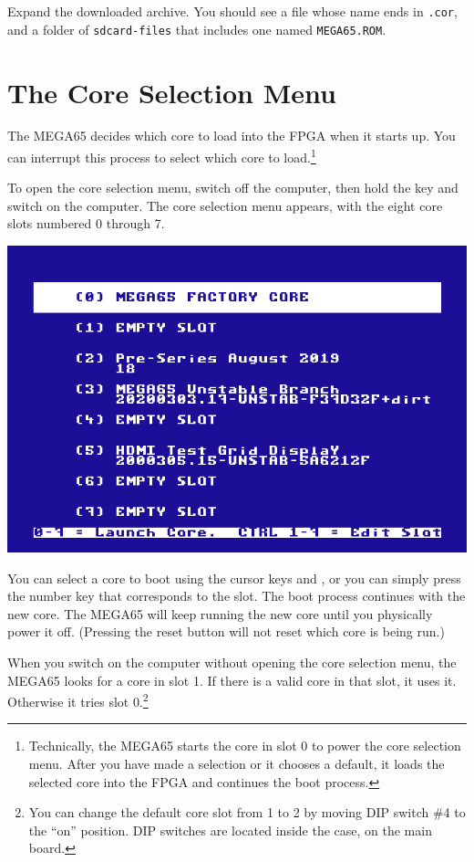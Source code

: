 Expand the downloaded archive. You should see a file whose name ends in {\tt .cor}, and a folder of {\tt sdcard-files} that includes one named {\tt MEGA65.ROM}.

\section{The Core Selection Menu}

The MEGA65 decides which core to load into the FPGA when it starts up. You can interrupt this process to select which core to load.\footnote{Technically, the MEGA65 starts the core in slot 0 to power the core selection menu. After you have made a selection or it chooses a default, it loads the selected core into the FPGA and continues the boot process.}

To open the core selection menu, switch off the computer, then hold the  key and switch on the computer. The core selection menu appears, with the eight core slots numbered 0 through 7.

\begin{center}
  \includegraphics[width=0.7\linewidth]{images/ss-flashmenu.png}
\end{center}

You can select a core to boot using the cursor keys and , or you can simply press the number key that corresponds to the slot. The boot process continues with the new core. The MEGA65 will keep running the new core until you physically power it off. (Pressing the reset button will not reset which core is being run.)

When you switch on the computer without opening the core selection menu, the MEGA65 looks for a core in slot 1. If there is a valid core in that slot, it uses it. Otherwise it tries slot 0.\footnote{You can change the default core slot from 1 to 2 by moving DIP switch \#4 to the ``on'' position. DIP switches are located inside the case, on the main board.}

